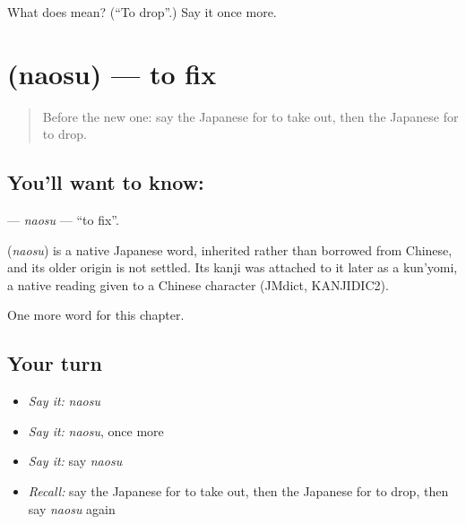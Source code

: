 \begin{tcolorbox}[breakable,colback=teal!4,colframe=teal!35!black,title={Before you move on}]
What does  mean? (\textquotedblleft{}To drop\textquotedblright{}.) Say it once more.
\end{tcolorbox}
\section[\texorpdfstring{\ja{なおす} (naosu)}{なおす (naosu)}]{ (naosu) — to fix}

\label{lesson:JA-C31-naosu}



\begin{quote}
Before the new one: say the Japanese for to take out, then the Japanese for to drop.
\end{quote}

\subsection*{You'll want to know: }
\textbf{} — \emph{naosu} — \textquotedblleft{}to fix\textquotedblright{}.

\begin{cousinweb}
\textbf{} (\emph{naosu}) is a native Japanese word, inherited rather than borrowed from Chinese, and its older origin is not settled. Its kanji was attached to it later as a kun'yomi, a native reading given to a Chinese character (JMdict, KANJIDIC2).
\end{cousinweb}

\begin{grammarlens}[title={What you've built}]
One more word for this chapter.
\end{grammarlens}

\subsection*{Your turn}
\begin{itemize}
\raggedright
  \item \emph{Say it:} \emph{naosu}
  \item \emph{Say it:} \emph{naosu}, once more
  \item \emph{Say it:} say \emph{naosu}
  \item \emph{Recall:} say the Japanese for to take out, then the Japanese for to drop, then say \emph{naosu} again
\end{itemize}

